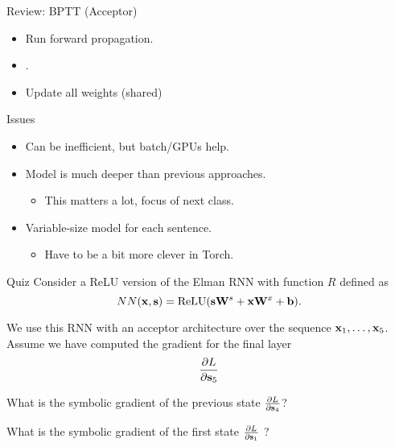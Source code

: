 \documentclass{beamer}
\begin{document}
\begin{frame}{Review: BPTT (Acceptor)}
  \begin{itemize}
  \item \alert{Run forward propagation}.
  \item {}.
  \item Update all weights (shared)
  \end{itemize}

    \begin{center}
    \end{center}
\end{frame}

\begin{frame}{Issues}
  \begin{itemize}
  \item Can be inefficient, but batch/GPUs help.
    \air

  \item Model is much deeper than previous approaches.
    \begin{itemize}
    \item This matters a lot, focus of next class.
    \end{itemize}
    \air

  \item Variable-size model for each sentence.
    \begin{itemize}
    \item Have to be a bit more clever in Torch.
    \end{itemize}
  \end{itemize}
\end{frame}

\begin{frame}{Quiz}
  Consider a ReLU version of the Elman RNN with function $R$ defined as
    \[ NN(\boldx, \bolds) = \relu( \bolds \boldW^s  +  \boldx \boldW^x  + \boldb).\]
    
    We  use this RNN with an acceptor architecture over the sequence $\mathbf{x}_1, \ldots, \mathbf{x}_5$.
    Assume we have computed the gradient for the final layer 
    \[ \frac{\partial L}{\partial \mathbf{s}_5} \]   

    What is the symbolic gradient of the previous state
    $ \frac{\partial L}{\partial \mathbf{s}_4 }$?    
    
    \air 
    What is the symbolic gradient of the first state
    $ \frac{\partial L}{\partial \mathbf{s}_1 }$ ? 

\end{frame}
\end{document}
